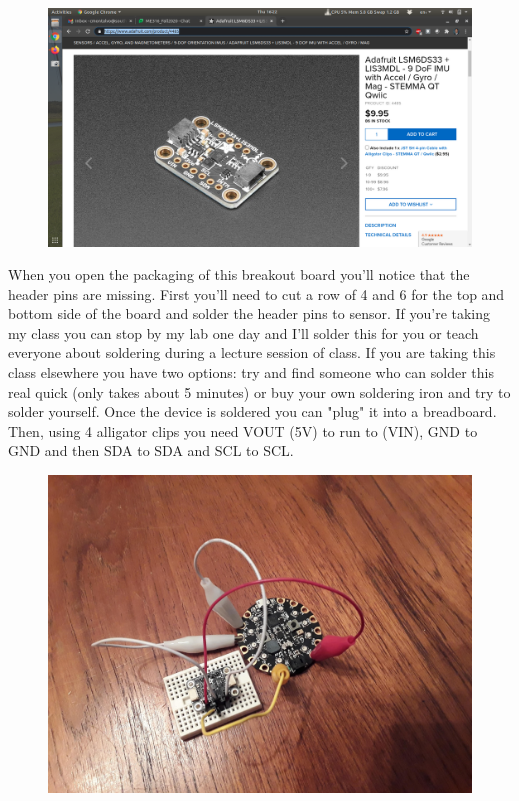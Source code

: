 \begin{figure}[H]
  \begin{center}
    \includegraphics[width=\textwidth]{Figures/imu2.png}
  \end{center}
\end{figure}
When you open the packaging of this breakout board you’ll notice that the header pins are missing. First you’ll need to cut a row of 4 and 6 for the top and bottom side of the board and solder the header pins to sensor. If you’re taking my class you can stop by my lab one day and I’ll solder this for you or teach everyone about soldering during a lecture session of class. If you are taking this class elsewhere you have two options: try and find someone who can solder this real quick (only takes about 5 minutes) or buy your own soldering iron and try to solder yourself. Once the device is soldered you can "plug" it into a breadboard. Then, using 4 alligator clips you need VOUT (5V) to run to (VIN), GND to GND and then SDA to SDA and SCL to SCL.
\begin{figure}[H]
  \begin{center}
    \includegraphics[width=\textwidth]{Figures/imu_circuit.jpeg}
  \end{center}
\end{figure}
